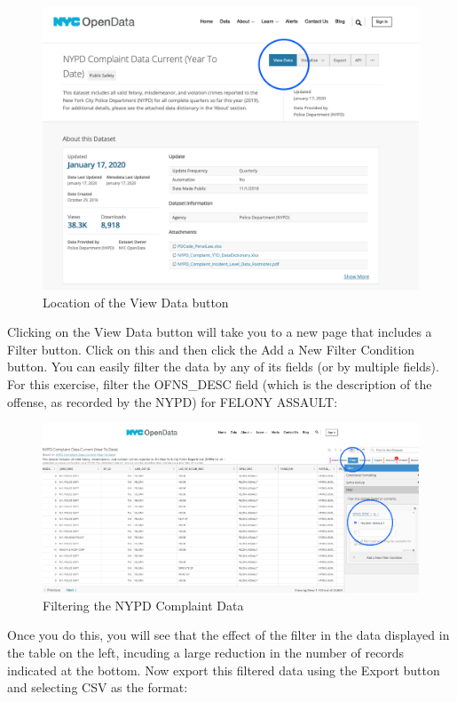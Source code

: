 \documentclass[]{book}
\begin{document}
\begin{figure}
\centering
\includegraphics{images/NYPD_CD_view.png}
\caption{Location of the View Data button}
\end{figure}

Clicking on the View Data button will take you to a new page that includes a Filter button. Click on this and then click the Add a New Filter Condition button. You can easily filter the data by any of its fields (or by multiple fields). For this exercise, filter the OFNS\_DESC field (which is the description of the offense, as recorded by the NYPD) for FELONY ASSAULT:

\begin{figure}
\centering
\includegraphics{images/NYPD_CD_filter.png}
\caption{Filtering the NYPD Complaint Data}
\end{figure}

Once you do this, you will see that the effect of the filter in the data displayed in the table on the left, incuding a large reduction in the number of records indicated at the bottom. Now export this filtered data using the Export button and selecting CSV as the format:
\end{document}
